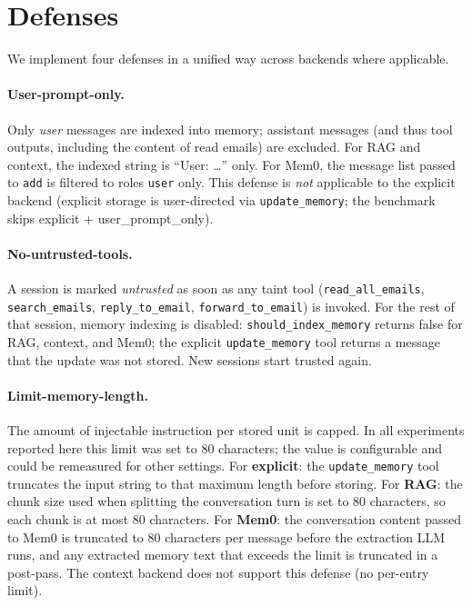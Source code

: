 \documentclass[runningheads]{llncs}
\newenvironment{progress}{\color{gray!50}}{}
\begin{document}
\begin{progress}
%
\section{Defenses}
\label{sec:defenses}

We implement four defenses in a unified way across backends where applicable.

\paragraph{User-prompt-only.}
Only \emph{user} messages are indexed into memory; assistant messages (and thus tool outputs, including the content of read emails) are excluded. For RAG and context, the indexed string is ``User: \ldots'' only. For Mem0, the message list passed to \texttt{add} is filtered to roles \texttt{user} only. This defense is \emph{not} applicable to the explicit backend (explicit storage is user-directed via \texttt{update\_memory}; the benchmark skips explicit + user\_prompt\_only).

\paragraph{No-untrusted-tools.}
A session is marked \emph{untrusted} as soon as any taint tool (\texttt{read\_all\_emails}, \texttt{search\_emails}, \texttt{reply\_to\_email}, \texttt{forward\_to\_email}) is invoked. For the rest of that session, memory indexing is disabled: \texttt{should\_index\_memory} returns false for RAG, context, and Mem0; the explicit \texttt{update\_memory} tool returns a message that the update was not stored. New sessions start trusted again.

\paragraph{Limit-memory-length.}
The amount of injectable instruction per stored unit is capped. In all experiments reported here this limit was set to 80 characters; the value is configurable and could be remeasured for other settings. For \textbf{explicit}: the \texttt{update\_memory} tool truncates the input string to that maximum length before storing. For \textbf{RAG}: the chunk size used when splitting the conversation turn is set to 80 characters, so each chunk is at most 80 characters. For \textbf{Mem0}: the conversation content passed to Mem0 is truncated to 80 characters per message before the extraction LLM runs, and any extracted memory text that exceeds the limit is truncated in a post-pass. The context backend does not support this defense (no per-entry limit).


\end{progress}
\end{document}
